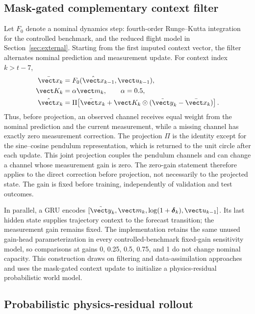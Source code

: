 \subsection{Mask-gated complementary context filter}

Let $F_0$ denote a nominal dynamics step: fourth-order Runge--Kutta integration
for the controlled benchmark, and the reduced flight model in
Section~\ref{sec:external}. Starting from the first imputed context vector, the
filter alternates nominal prediction and measurement update. For context index
$k>t-7$,
\begin{align}
 \bar{\vect x}_{k} &= F_0(\hat{\vect x}_{k-1},\vect u_{k-1}),\\
 \vect K_k &= \alpha\vect m_k,\qquad \alpha=0.5,\\
 \hat{\vect x}_k &= \Pi\!\left[
 \bar{\vect x}_k+\vect K_k\odot
 (\tilde{\vect y}_k-\bar{\vect x}_k)\right].
 \label{eq:complementary-update}
\end{align}
Thus, before projection, an observed channel receives equal weight from the
nominal prediction and the current measurement, while a missing channel has
exactly zero measurement correction. The projection $\Pi$ is the identity
except for the sine--cosine pendulum representation, which is returned to the
unit circle after each update. This joint projection couples the pendulum
channels and can change a channel whose measurement gain is zero. The zero-gain
statement therefore applies to the direct correction before projection, not
necessarily to the projected state. The gain is
fixed before training, independently of validation and test outcomes.

In parallel, a GRU encodes
$[\tilde{\vect y}_k,\vect m_k,\log(1+\boldsymbol\delta_k),\vect u_{k-1}]$.
Its last hidden state supplies trajectory context to the forecast transition;
the measurement gain remains fixed. The implementation retains the
same unused gain-head parameterization in every controlled-benchmark
fixed-gain sensitivity model,
so comparisons at gains 0, 0.25, 0.5, 0.75, and 1 do not change nominal
capacity. This construction draws on filtering and data-assimilation approaches
\cite{revach2022_kalmannet,cheng2023_machine_learning_with_data_assimilation}
and uses the mask-gated context update to initialize a physics-residual
probabilistic world model.

\subsection{Probabilistic physics-residual rollout}

